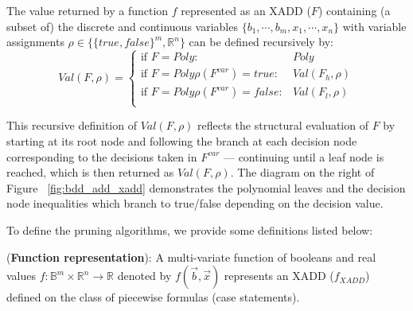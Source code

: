 \documentclass[twoside,11pt]{article}
\newenvironment{mydef}[1][Definition]{\begin{trivlist}
\item[\hskip \labelsep {\bfseries #1}]}{\end{trivlist}}
\begin{document}
The value returned by a function $f$ represented as an XADD ($F$) containing (a subset of) the discrete and continuous variables $\{ b_1,\cdots,b_m, x_1,\cdots, x_n \}$ with variable assignments $\rho \in \lbrace \lbrace\mathit{true}, \mathit{false} \rbrace^m,\mathbb{R}^n \rbrace$ can be defined recursively by:
\begin{equation*}
Val(F,\rho) = \left\{
\begin{array}{lll}
\textrm{if } F=\mathit{Poly} :&\mathit{Poly}\\
\textrm{if } F = \mathit{Poly} \rho(F^{var})=\mathit{true}: & \mathit{Val} (F_h,\rho)\\
\textrm{if } F = \mathit{Poly}  \rho(F^{var})=\mathit{false}: & \mathit{Val} (F_l,\rho)\\
\end{array} \right. 
\end{equation*}

This recursive definition of $Val(F,\rho)$ reflects the structural
evaluation of $F$ by starting at its root node and following
the branch at each decision node corresponding to the decisions taken
in $F^{var}$ --- continuing until a leaf node is reached,
which is then returned as $Val(F,\rho)$. The diagram on the right of Figure ~\ref{fig:bdd_add_xadd} demonstrates the polynomial leaves and the decision node inequalities which branch to true/false depending on the decision value.


To define the pruning algorithms, we provide some definitions listed below:

\begin{mydef}(\textbf{Function representation}):
A multi-variate function of booleans and real values $ f:\mathbb{B}^m \times \mathbb{R}^n \rightarrow \mathbb{R}$ denoted by $f(\vec{b},\vec{x})$  represents an XADD ($f_{XADD}$) defined on the class of piecewise formulas (case statements).
\end{mydef}
\end{document}
